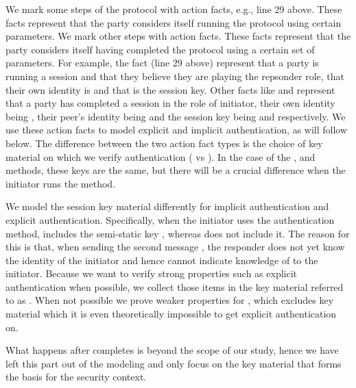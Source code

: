 We mark some steps of the protocol with  action facts, e.g., line 29
above.
%
These facts represent that the party considers itself running the
protocol using certain parameters.
%
We mark other steps with  action facts.
%
These facts represent that the party considers itself having
completed the protocol using a certain set of parameters.
%
For example, the fact  (line 29 above)
represent that a party is running a session and that they believe
they are playing the repsonder role, that their own identity is 
and that  is the session key.
%
Other facts like 
%
and  represent that a party has completed
a session in the role of initiator, their own identity being , their
peer's identity being  and the session key being  and
 respectively.
%
We use these action facts to model explicit and implicit authentication, as will
follow below.
%
The difference between the two  action fact types is the choice of
key material on which we verify authentication ( vs ).
%
In the case of the \mSigSig{}, \mSigStat{} and \mPskPsk{} methods, these keys
are the same, but there will be a crucial difference when the initiator runs
the \mStat{} method.
%

We model the session key material differently for implicit authentication and
explicit authentication.
%
Specifically, when the initiator uses the \mStat{} authentication method,
 includes the semi-static key \mGiy{}, whereas  does not
include it.
%
The reason for this is that, when sending the second message \mMsgtwo{}, the
responder does not yet know the identity of the initiator and hence cannot
indicate knowledge of \mGiy{} to the initiator.
%
Because we want to verify strong properties such as explicit authentication
when possible, we collect those items in the key material referred to as
.
%
When not possible we prove weaker properties for , which excludes
key material which it is even theoretically impossible to get explicit
authentication on.
%

What happens after \mEdhoc{} completes is beyond the scope of our study, hence
we have left this part out of the modeling and only focus on the key material
that forms the basis for the \mOscore{} security context.
%

